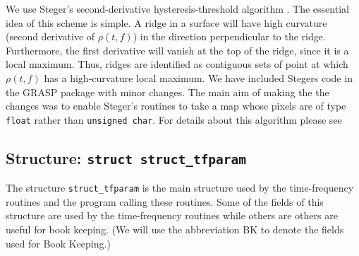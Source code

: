 We use Steger's second-derivative hysteresis-threshold algorithm
\cite{Stegerspap}. The essential idea of this scheme is simple. A ridge in a
surface will have high curvature (second derivative of $\rho(t,f)$) in the
direction perpendicular to the ridge. Furthermore, the first derivative will
vanish at the top of the ridge, since it is a local maximum. Thus, ridges are
identified as contiguous sets of point at which $\rho(t,f)$ has a
high-curvature local maximum. We have included Stegers code
\cite{Stegerscode} in the GRASP package with minor changes. The main
aim of making the the changes was to enable Steger's routines to take
a map whose pixels are of type {\tt float} rather than {\tt unsigned
char}. For details about this algorithm please see \cite{timefreqpap,Stegerspap}





\newpage
\subsection{Structure: {\tt struct struct\_tfparam}}
\label{ss:tfstruct}
The structure  {\tt struct\_tfparam} is the main structure used by the
time-frequency routines and the program calling these routines. Some
of the fields of this structure are used by the time-frequency
routines while others are others are useful for book keeping. 
(We will use the abbreviation BK to denote the fields used for Book Keeping.) 


